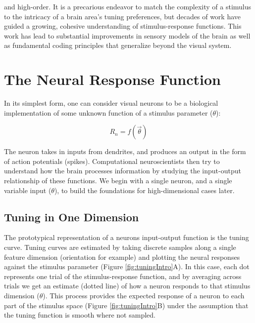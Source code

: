 and high-order. It is a precarious endeavor to match the complexity of a stimulus to the intricacy of a brain area's tuning preferences, but decades of work have guided a growing, cohesive understanding of stimulus-response functions. This work has lead to substantial improvements in sensory models of the brain as well as fundamental coding principles that generalize beyond the visual system.


\section{The Neural Response Function}
In its simplest form, one can consider visual neurons to be a biological implementation of some unknown function of a stimulus parameter ($\theta$):

\begin{equation}
R_n = f(\vec{\theta})
\end{equation}


The neuron takes in inputs from dendrites, and produces an output in the form of action potentials (spikes). Computational neuroscientists then try to understand how the brain processes information by studying the input-output relationship of these functions. We begin with a single neuron, and a single variable input ($\theta$), to build the foundations for high-dimensional cases later.

\subsection{Tuning in One Dimension}

The prototypical representation of a neurons input-output function is the tuning curve. Tuning curves are estimated by taking discrete samples along a single feature dimension (orientation for example) and plotting the neural responses against the stimulus parameter (Figure \ref{fig:tuningIntro}A). In this case, each dot represents one trial of the stimulus-response function, and by averaging across trials we get an estimate (dotted line) of how a neuron responds to that stimulus dimension ($\theta$). This process provides the expected response of a neuron to each part of the stimulus space (Figure \ref{fig:tuningIntro}B) under the assumption that the tuning function is smooth where not sampled. 
 
